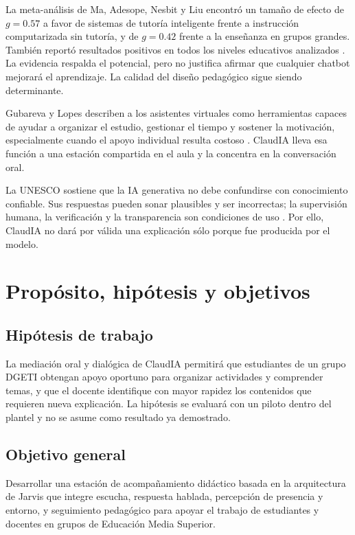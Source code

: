 \documentclass[letterpaper,11pt]{article}
\begin{document}
La meta-análisis de Ma, Adesope, Nesbit y Liu encontró un tamaño de efecto de $g=0.57$ a favor de sistemas de tutoría inteligente frente a instrucción computarizada sin tutoría, y de $g=0.42$ frente a la enseñanza en grupos grandes. También reportó resultados positivos en todos los niveles educativos analizados \cite{ma2014}. La evidencia respalda el potencial, pero no justifica afirmar que cualquier chatbot mejorará el aprendizaje. La calidad del diseño pedagógico sigue siendo determinante.

Gubareva y Lopes describen a los asistentes virtuales como herramientas capaces de ayudar a organizar el estudio, gestionar el tiempo y sostener la motivación, especialmente cuando el apoyo individual resulta costoso \cite{gubareva2020}. ClaudIA lleva esa función a una estación compartida en el aula y la concentra en la conversación oral.

La UNESCO sostiene que la IA generativa no debe confundirse con conocimiento confiable. Sus respuestas pueden sonar plausibles y ser incorrectas; la supervisión humana, la verificación y la transparencia son condiciones de uso \cite{unesco2024guide}. Por ello, ClaudIA no dará por válida una explicación sólo porque fue producida por el modelo.

\clearpage

\section{Propósito, hipótesis y objetivos}

\subsection*{Hipótesis de trabajo}
La mediación oral y dialógica de ClaudIA permitirá que estudiantes de un grupo DGETI obtengan apoyo oportuno para organizar actividades y comprender temas, y que el docente identifique con mayor rapidez los contenidos que requieren nueva explicación. La hipótesis se evaluará con un piloto dentro del plantel y no se asume como resultado ya demostrado.

\subsection*{Objetivo general}
Desarrollar una estación de acompañamiento didáctico basada en la arquitectura de Jarvis que integre escucha, respuesta hablada, percepción de presencia y entorno, y seguimiento pedagógico para apoyar el trabajo de estudiantes y docentes en grupos de Educación Media Superior.
\end{document}
